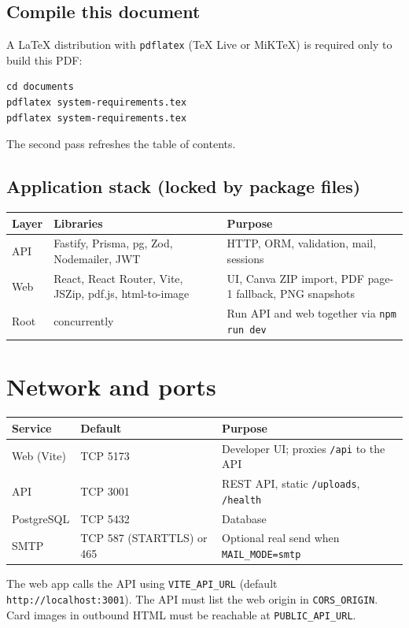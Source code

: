 \documentclass[11pt,a4paper]{article}
\begin{document}
\subsection{Compile this document}
A \LaTeX{} distribution with \texttt{pdflatex} (TeX Live or MiKTeX) is required only to build this PDF:
\begin{verbatim}
cd documents
pdflatex system-requirements.tex
pdflatex system-requirements.tex
\end{verbatim}
The second pass refreshes the table of contents.

\subsection{Application stack (locked by package files)}
\begin{tabularx}{\textwidth}{llX}
  \toprule
  \textbf{Layer} & \textbf{Libraries} & \textbf{Purpose} \\
  \midrule
  API & Fastify, Prisma, pg, Zod, Nodemailer, JWT & HTTP, ORM, validation, mail, sessions \\
  Web & React, React Router, Vite, JSZip, pdf.js, html-to-image & UI, Canva ZIP import, PDF page-1 fallback, PNG snapshots \\
  Root & concurrently & Run API and web together via \texttt{npm run dev} \\
  \bottomrule
\end{tabularx}

\section{Network and ports}
\label{sec:network}
\begin{tabularx}{\textwidth}{llX}
  \toprule
  \textbf{Service} & \textbf{Default} & \textbf{Purpose} \\
  \midrule
  Web (Vite) & TCP 5173 & Developer UI; proxies \texttt{/api} to the API \\
  API & TCP 3001 & REST API, static \texttt{/uploads}, \texttt{/health} \\
  PostgreSQL & TCP 5432 & Database \\
  SMTP & TCP 587 (STARTTLS) or 465 & Optional real send when \texttt{MAIL\_MODE=smtp} \\
  \bottomrule
\end{tabularx}

The web app calls the API using \texttt{VITE\_API\_URL} (default \texttt{http://localhost:3001}). The API must list the web origin in \texttt{CORS\_ORIGIN}. Card images in outbound HTML must be reachable at \texttt{PUBLIC\_API\_URL}.
\end{document}
